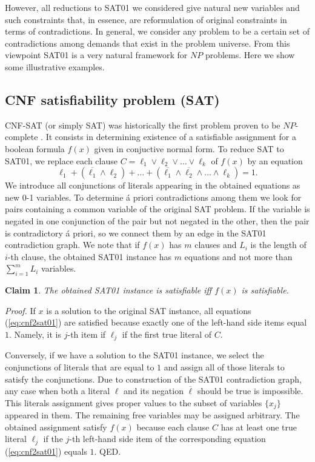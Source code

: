 \documentclass[11pt]{article}
\newtheorem{claim}{Claim}
\begin{document}
However, all reductions to SAT01 we considered give natural new variables and such constraints that, in essence, are reformulation of original constraints in terms of contradictions. In general, we consider any problem to be a certain set of contradictions among demands that exist in the problem universe. From this viewpoint SAT01 is a very natural framework for $NP$ problems. Here we show some illustrative examples.

\subsection{CNF satisfiability problem (SAT)}
CNF-SAT (or simply SAT) was historically the first problem proven to be $NP$-complete \cite{GJ79,C71}. It consists in determining existence of a satisfiable assignment for a boolean formula $f(x)$ given in conjuctive normal form. To reduce SAT to SAT01, we replace each clause $C = \ell_1 \lor \ell_2 \lor \ldots \lor \ell_k$ of $f(x)$ by an equation
\begin{equation}
\label{eq:cnf2sat01}
\ell_1+(\overline{\ell_1} \land \ell_2)+ \ldots +(\overline{\ell_1} \land \overline{\ell_2} \land \ldots \land \ell_k)=1.
\end{equation}
We introduce all conjunctions of literals appearing in the obtained equations as new 0-1 variables. To determine \'a priori contradictions among them we look for pairs containing a common variable of the original SAT problem. If the variable is negated in one conjunction of the pair but not negated in the other, then the pair is contradictory \'a priori, so we connect them by an edge in the SAT01 contradiction graph. We note that if $f(x)$ has $m$ clauses and $L_i$ is the length of $i$-th clause, the obtained SAT01 instance has $m$ equations and not more than $\sum_{i=1}^m L_i$ variables.
\begin{claim}
The obtained SAT01 instance is satisfiable iff $f(x)$ is satisfiable.
\end{claim}

{\em Proof.\/} If $x$ is a solution to the original SAT instance, all equations (\ref{eq:cnf2sat01}) are satisfied because exactly one of the left-hand side items equal $1$. Namely, it is $j$-th item if $\ell_j$ if the first true literal of $C$.

Conversely, if we have a solution to the SAT01 instance, we select the conjunctions of literals that are equal to $1$ and assign all of those literals to satisfy the conjunctions. Due to construction of the SAT01 contradiction graph, any case when both a literal $\ell$ and its negation $\overline{\ell}$ should be true is impossible. This literals assignment gives proper values to the subset of variables $\{x_j\}$ appeared in them. The remaining free variables may be assigned arbitrary. The obtained assignment satisfy $f(x)$ because each clause $C$ has at least one true literal $\ell_j$ if the $j$-th left-hand side item of the corresponding equation (\ref{eq:cnf2sat01}) equals $1$. QED.
\end{document}
